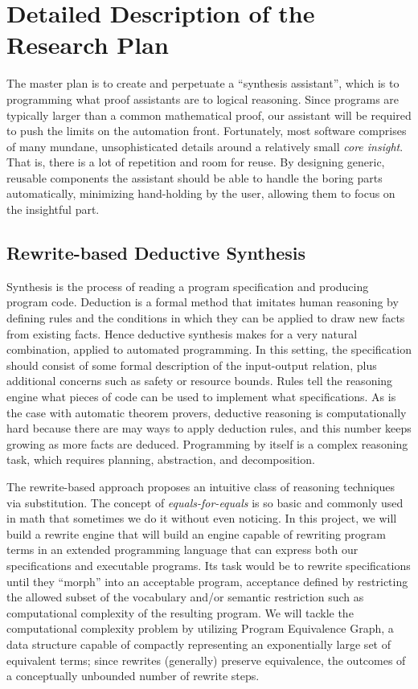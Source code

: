 \section{Detailed Description of the Research Plan}

The master plan is to create and perpetuate a ``synthesis assistant'',
which is to programming what proof assistants are to logical reasoning.
Since programs are typically larger than a common mathematical proof,
our assistant will be required to push the limits on the automation
front.
Fortunately, most software comprises of many mundane, unsophisticated
details around a relatively small \emph{core insight}.
That is, there is a lot of repetition and room for reuse.
By designing generic, reusable components the assistant should be able
to handle the boring parts automatically, minimizing hand-holding by
the user, allowing them to focus on the insightful part.

\subsection{Rewrite-based Deductive Synthesis}

Synthesis is the process of reading a program specification and
producing program code.
Deduction is a formal method that imitates human reasoning by defining
rules and the conditions in which they can be applied to draw new facts
from existing facts.
Hence deductive synthesis makes for a very natural combination, applied
to automated programming.
In this setting, the specification should consist of some formal description
of the input-output relation, plus additional concerns such as safety or
resource bounds.
Rules tell the reasoning engine what pieces of code can be used to implement
what specifications.
As is the case with automatic theorem provers, deductive reasoning is
computationally hard because there are may ways to apply deduction rules,
and this number keeps growing as more facts are deduced.
Programming by itself is a complex reasoning task, which requires planning,
abstraction, and decomposition.

The rewrite-based approach proposes an intuitive class of reasoning techniques
via substitution.
The concept of \emph{equals-for-equals} is so basic and commonly used in math
that sometimes we do it without even noticing.
In this project, we will build a rewrite engine that will build an engine
capable of rewriting program terms in an extended programming language that
can express both our specifications and executable programs.
Its task would be to rewrite specifications until they ``morph'' into an
acceptable program, acceptance defined by restricting the allowed subset of the
vocabulary and/or semantic restriction such as computational complexity
of the resulting program.
We will tackle the computational complexity problem by utilizing Program
Equivalence Graph, a data structure capable of compactly representing an
exponentially large set of equivalent terms;
since rewrites (generally) preserve equivalence,
the outcomes of a conceptually unbounded number of rewrite steps.

